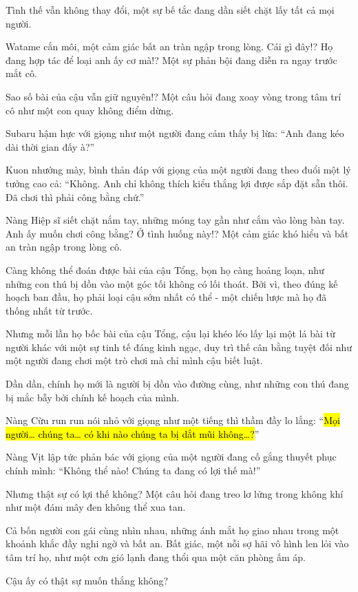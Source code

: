 \documentclass[../main.tex]{subfiles}
\begin{document}
Tình thế vẫn không thay đổi, một sự bế tắc đang dần siết chặt lấy tất cả mọi người.

Watame cắn môi, một cảm giác bất an tràn ngập trong lòng. Cái gì đây!? Họ đang hợp tác để loại anh ấy cơ mà!? Một sự phản bội đang diễn ra ngay trước mắt cô.

Sao số bài của cậu vẫn giữ nguyên!? Một câu hỏi đang xoay vòng trong tâm trí cô như một con quay không điểm dừng.

Subaru hậm hực với giọng như một người đang cảm thấy bị lừa: ``Anh đang kéo dài thời gian đấy à?''

Kuon nhướng mày, bình thản đáp với giọng của một người đang theo đuổi một lý tưởng cao cả: ``Không. Anh chỉ không thích kiểu thắng lợi được sắp đặt sẵn thôi. Đã chơi thì phải công bằng chứ.''

Nàng Hiệp sĩ siết chặt nắm tay, những móng tay gần như cắm vào lòng bàn tay. Anh ấy muốn chơi công bằng? Ở tình huống này!? Một cảm giác khó hiểu và bất an tràn ngập trong lòng cô.

Càng không thể đoán được bài của cậu Tổng, bọn họ càng hoảng loạn, như những con thú bị dồn vào một góc tối không có lối thoát.  Bởi vì, theo đúng kế hoạch ban đầu, họ phải loại cậu sớm nhất có thể - một chiến lược mà họ đã thống nhất từ trước.

Nhưng mỗi lần họ bốc bài của cậu Tổng, cậu lại khéo léo lấy lại một lá bài từ người khác với một sự tinh tế đáng kinh ngạc, duy trì thế cân bằng tuyệt đối như một người đang chơi một trò chơi mà chỉ mình cậu biết luật.

Dần dần, chính họ mới là người bị dồn vào đường cùng, như những con thú đang bị mắc bẫy bởi chính kế hoạch của mình.

Nàng Cừu run run nói nhỏ với giọng như một tiếng thì thầm đầy lo lắng: ``\hl{Mọi người\dots{} chúng ta\dots{} có khi nào chúng ta bị dắt mũi không\dots?}''

Nàng Vịt lập tức phản bác với giọng của một người đang cố gắng thuyết phục chính mình: ``Không thể nào! Chúng ta đang có lợi thế mà!''

Nhưng thật sự có lợi thế không? Một câu hỏi đang treo lơ lửng trong không khí như một đám mây đen không thể xua tan.

Cả bốn người con gái cùng nhìn nhau, những ánh mắt họ giao nhau trong một khoảnh khắc đầy nghi ngờ và bất an. Bất giác, một nỗi sợ hãi vô hình len lỏi vào tâm trí họ, như một cơn gió lạnh đang thổi qua một căn phòng ấm áp.

Cậu ấy có thật sự muốn thắng không?
\end{document}
